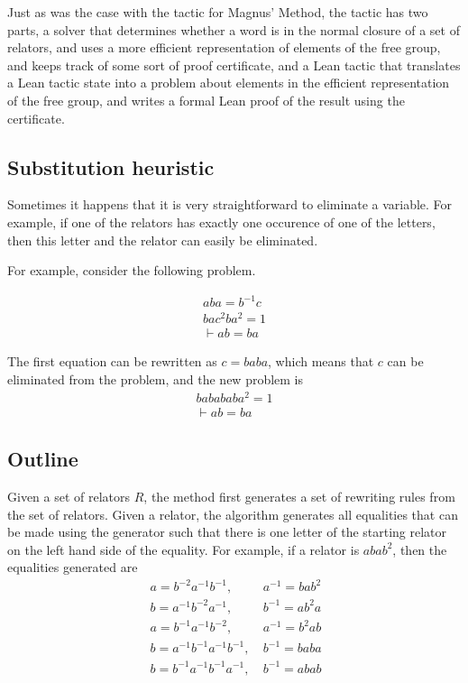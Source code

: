 \documentclass[12pt]{article} %
\theoremstyle{definition}
\theoremstyle{definition}
\theoremstyle{definition}
\theoremstyle{definition}
\theoremstyle{definition}
\theoremstyle{definition}
\begin{document}
  Just as was the case with the tactic for Magnus' Method, the tactic has two parts,
  a solver that determines whether a word is in the normal closure of a set of relators,
  and uses a more efficient representation of elements of the free group, and keeps track
  of some sort of proof certificate, and a Lean tactic that translates a Lean tactic state
  into a problem about elements in the efficient representation of the free group, and
  writes a formal Lean proof of the result using the certificate.

\subsection{Substitution heuristic}\label{subst}
  Sometimes it happens that it is very straightforward to eliminate a variable.
  For example, if one of the relators has exactly one occurence of one of the
  letters, then this letter and the relator can easily be eliminated.

  For example, consider the following problem.

  \begin{equation}
    \begin{aligned}
      aba =b^{-1}c \\
      bac^2ba^2 = 1 \\
      \vdash ab=ba
    \end{aligned}
  \end{equation}

The first equation can be rewritten as $c = baba$, which means that $c$ can be eliminated
from the problem, and the new problem is
\begin{equation}
  \begin{aligned}
    babababa^2 = 1 \\
    \vdash ab=ba
  \end{aligned}
\end{equation}

\subsection{Outline}

  Given a set of relators $R$, the method first generates a set of rewriting rules
  from the set of relators. Given a relator, the algorithm generates all equalities
  that can be made using the generator such that there is one letter of the starting
  relator on the left hand side of the equality.
  For example, if a relator is $abab^2$, then the equalities generated are
  \begin{equation}\
    \begin{aligned}
      a = b^{-2}a^{-1}b^{-1}, \ & a^{-1} = bab^2 \\
      b = a^{-1}b^{-2}a^{-1},\ & b^{-1} = ab^2a \\
      a=b^{-1}a^{-1}b^{-2}, \ & a^{-1}=b^2ab \\
      b=a^{-1}b^{-1}a^{-1}b^{-1}, \  & b^{-1} = baba \\
      b=b^{-1}a^{-1}b^{-1}a^{-1}, \ & b^{-1} = abab
    \end{aligned}
  \end{equation}
\end{document}
